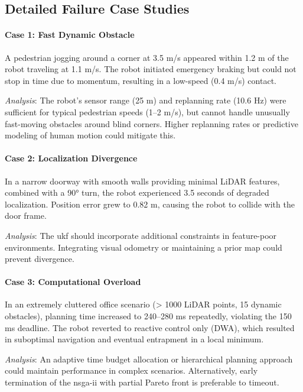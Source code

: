 \subsection{Detailed Failure Case Studies}

\paragraph{Case 1: Fast Dynamic Obstacle}
A pedestrian jogging around a corner at 3.5 m/s appeared within 1.2 m of the robot traveling at 1.1 m/s. The robot initiated emergency braking but could not stop in time due to momentum, resulting in a low-speed (0.4 m/s) contact.

\textit{Analysis}: The robot's sensor range (25 m) and replanning rate (10.6 Hz) were sufficient for typical pedestrian speeds (1--2 m/s), but cannot handle unusually fast-moving obstacles around blind corners. Higher replanning rates or predictive modeling of human motion could mitigate this.

\paragraph{Case 2: Localization Divergence}
In a narrow doorway with smooth walls providing minimal LiDAR features, combined with a 90° turn, the robot experienced 3.5 seconds of degraded localization. Position error grew to 0.82 m, causing the robot to collide with the door frame.

\textit{Analysis}: The \acrshort{ukf} should incorporate additional constraints in feature-poor environments. Integrating visual odometry or maintaining a prior map could prevent divergence.

\paragraph{Case 3: Computational Overload}
In an extremely cluttered office scenario (> 1000 LiDAR points, 15 dynamic obstacles), planning time increased to 240--280 ms repeatedly, violating the 150 ms deadline. The robot reverted to reactive control only (DWA), which resulted in suboptimal navigation and eventual entrapment in a local minimum.

\textit{Analysis}: An adaptive time budget allocation or hierarchical planning approach could maintain performance in complex scenarios. Alternatively, early termination of the \acrshort{nsga-ii} with partial Pareto front is preferable to timeout.

